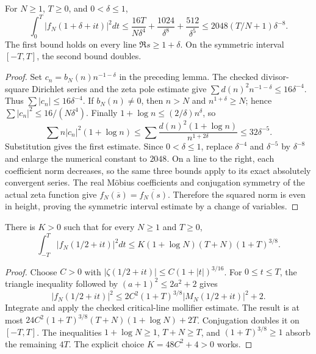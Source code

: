 \begin{lemma}
\label{construction:mollifier-right}
\leanok
For $N\ge1$, $T\ge0$, and $0<\delta\le1$,
\[
 \int_0^T|f_N(1+\delta+it)|^2dt
 \le\frac{16T}{N\delta^4}+\frac{1024}{\delta^8}
       +\frac{512}{\delta^5}
 \le2048(T/N+1)\delta^{-8}.
\]
The first bound holds on every line $\Re s\ge1+\delta$.
On the symmetric interval $[-T,T]$, the second bound doubles.
\end{lemma}
\begin{proof}
Set $c_n=b_N(n)n^{-1-\delta}$ in the preceding lemma.
The checked divisor-square Dirichlet series and the zeta pole estimate give
$\sum d(n)^2n^{-1-\delta}\le16\delta^{-4}$.
Thus $\sum|c_n|\le16\delta^{-4}$.
If $b_N(n)\ne0$, then $n>N$ and $n^{1+\delta}\ge N$; hence
$\sum|c_n|^2\le16/(N\delta^4)$.
Finally
$1+\log n\le(2/\delta)n^\delta$, so
\[
 \sum n|c_n|^2(1+\log n)
 \le\sum\frac{d(n)^2(1+\log n)}{n^{1+2\delta}}
 \le32\delta^{-5}.
\]
Substitution gives the first estimate.
Since $0<\delta\le1$, replace $\delta^{-4}$ and $\delta^{-5}$ by
$\delta^{-8}$ and enlarge the numerical constant to $2048$.
On a line to the right, each coefficient norm decreases, so the same
three bounds apply to its exact absolutely convergent series.
The real M\"obius coefficients and conjugation symmetry of the actual
zeta function give $f_N(\overline{s})=\overline{f_N(s)}$.
Therefore the squared norm is even in height, proving the symmetric
interval estimate by a change of variables.
\end{proof}

\begin{lemma}
\label{construction:mollifier-left}
\leanok
There is $K>0$ such that for every $N\ge1$ and $T\ge0$,
\[
 \int_{-T}^T|f_N(1/2+it)|^2dt
 \le K(1+\log N)(T+N)(1+T)^{3/8}.
\]
\end{lemma}
\begin{proof}
Choose $C>0$ with
$|\zeta(1/2+it)|\le C(1+|t|)^{3/16}$.
For $0\le t\le T$, the triangle inequality followed by
$(a+1)^2\le2a^2+2$ gives
\[
 |f_N(1/2+it)|^2
 \le2C^2(1+T)^{3/8}|M_N(1/2+it)|^2+2.
\]
Integrate and apply the checked critical-line mollifier estimate.
The result is at most
$24C^2(1+T)^{3/8}(T+N)(1+\log N)+2T$.
Conjugation doubles it on $[-T,T]$.
The inequalities $1+\log N\ge1$, $T+N\ge T$, and
$(1+T)^{3/8}\ge1$ absorb the remaining $4T$.
The explicit choice $K=48C^2+4>0$ works.
\end{proof}

